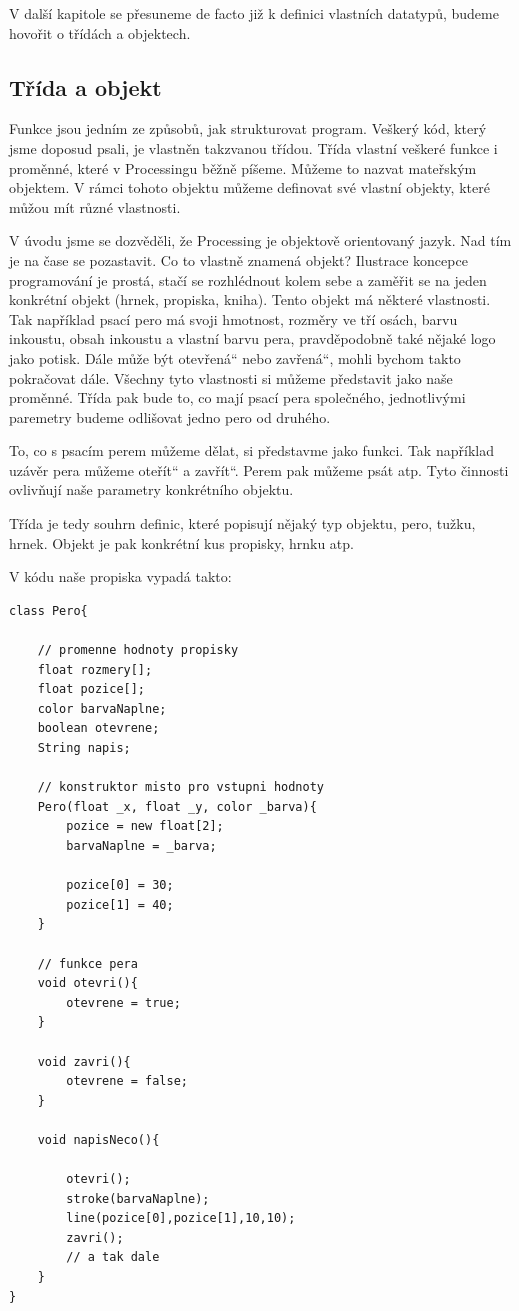 \documentclass[10pt]{book}
\renewcommand\uv[1]{\quotedblbase #1\textquotedblleft}%
\newcommand{\pododdil}[1]{\subsection{#1}\index{#1}\label{#1}}
\begin{document}
V další kapitole se přesuneme de facto již k definici vlastních datatypů, budeme hovořit o třídách a objektech.





\pododdil{Třída a objekt}

Funkce jsou jedním ze způsobů, jak strukturovat program. Veškerý kód, který jsme doposud psali, je vlastněn takzvanou třídou. Třída vlastní veškeré funkce i proměnné, které v Processingu běžně píšeme. Můžeme to nazvat mateřským objektem. V rámci tohoto objektu můžeme definovat své vlastní objekty, které můžou mít různé vlastnosti.

V úvodu jsme se dozvěděli, že Processing je objektově orientovaný jazyk. Nad tím je na čase se pozastavit. Co to vlastně znamená objekt? Ilustrace koncepce programování je prostá, stačí se rozhlédnout kolem sebe a zaměřit se na jeden konkrétní objekt (hrnek, propiska, kniha). Tento objekt má některé vlastnosti. Tak například psací pero má svoji hmotnost, rozměry ve tří osách, barvu inkoustu, obsah inkoustu a vlastní barvu pera, pravděpodobně také nějaké logo jako potisk. Dále může být \uv{otevřená} nebo \uv{zavřená}, mohli bychom takto pokračovat dále. Všechny tyto vlastnosti si můžeme představit jako naše proměnné. Třída pak bude to, co mají psací pera společného, jednotlivými paremetry budeme odlišovat jedno pero od druhého.

To, co s psacím perem můžeme dělat, si představme jako funkci. Tak například uzávěr pera můžeme \uv{oteřít} a \uv{zavřít}. Perem pak můžeme psát atp. Tyto činnosti ovlivňují naše parametry konkrétního objektu.

Třída je tedy souhrn definic, které popisují nějaký typ objektu, pero, tužku, hrnek. Objekt je pak konkrétní kus propisky, hrnku atp.

V kódu naše propiska vypadá takto:


\begin{lstlisting}
class Pero{

	// promenne hodnoty propisky
	float rozmery[];
	float pozice[];
	color barvaNaplne;
	boolean otevrene;
	String napis;

	// konstruktor misto pro vstupni hodnoty
	Pero(float _x, float _y, color _barva){
		pozice = new float[2];
		barvaNaplne = _barva;
		
		pozice[0] = 30;
		pozice[1] = 40;
	}
	
	// funkce pera
	void otevri(){
		otevrene = true;
	}
	
	void zavri(){
		otevrene = false;
	}
	
	void napisNeco(){
	
		otevri();
		stroke(barvaNaplne);
		line(pozice[0],pozice[1],10,10);
		zavri();
		// a tak dale
	}
}

\end{lstlisting}
\end{document}
